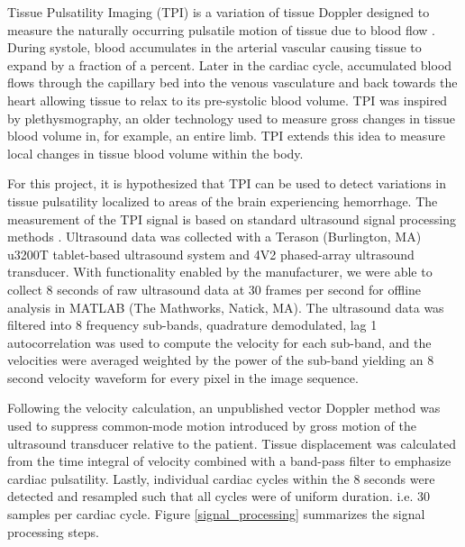 \documentclass [11pt, proquest] {uwthesis}[2020/02/24]
\begin{document}
Tissue Pulsatility Imaging (TPI) is a variation of tissue Doppler designed to measure the naturally occurring pulsatile motion 
of tissue due to blood flow \cite{kucewicz_functional_2007, kucewicz_tissue_2008}.  During systole, blood accumulates in the arterial vascular causing 
tissue to expand by a fraction of a percent. Later in the cardiac cycle, accumulated blood flows through the capillary bed into 
the venous vasculature and back towards the heart allowing tissue to relax to its pre-systolic blood volume.  TPI was inspired 
by plethysmography, an older technology used to measure gross changes in tissue blood volume in, for example, an entire limb.  
TPI extends this idea to measure local changes in tissue blood volume within the body.

For this project, it is hypothesized that TPI can be used to detect variations in tissue pulsatility localized to areas of the 
brain experiencing hemorrhage.  The measurement of the TPI signal is based on standard ultrasound signal processing methods 
\cite{evans_chapter_2000}.  Ultrasound data was collected with a Terason (Burlington, MA) u3200T tablet-based ultrasound system 
and 4V2 phased-array ultrasound transducer.  With functionality enabled by the manufacturer, we were able to collect 8 seconds 
of raw ultrasound data at 30 frames per second for offline analysis in MATLAB (The Mathworks, Natick, MA).  The ultrasound data 
was filtered into 8 frequency sub-bands, quadrature demodulated, lag 1 autocorrelation was used to compute the velocity for 
each sub-band, and the velocities were averaged weighted by the power of the sub-band yielding an 8 second velocity waveform 
for every pixel in the image sequence.

Following the velocity calculation, an unpublished vector Doppler method was used to suppress common-mode motion introduced by 
gross motion of the ultrasound transducer relative to the patient. Tissue displacement was calculated from the time integral of 
velocity combined with a band-pass filter to emphasize cardiac pulsatility.  Lastly, individual cardiac cycles within the 8 seconds 
were detected and resampled such that all cycles were of uniform duration. i.e. 30 samples per cardiac cycle. Figure 
\ref{signal_processing} summarizes the signal processing steps.
\end{document}
